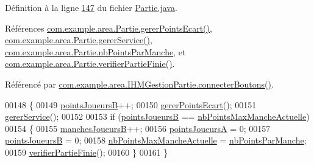 Définition à la ligne \hyperlink{_partie_8java_source_l00147}{147} du fichier \hyperlink{_partie_8java_source}{Partie.\+java}.



Références \hyperlink{_partie_8java_source_l00204}{com.\+example.\+area.\+Partie.\+gerer\+Points\+Ecart()}, \hyperlink{_partie_8java_source_l00220}{com.\+example.\+area.\+Partie.\+gerer\+Service()}, \hyperlink{_partie_8java_source_l00035}{com.\+example.\+area.\+Partie.\+nb\+Points\+Par\+Manche}, et \hyperlink{_partie_8java_source_l00192}{com.\+example.\+area.\+Partie.\+verifier\+Partie\+Finie()}.



Référencé par \hyperlink{_i_h_m_gestion_partie_8java_source_l00346}{com.\+example.\+area.\+I\+H\+M\+Gestion\+Partie.\+connecter\+Boutons()}.


\begin{DoxyCode}
00148     \{
00149         \hyperlink{classcom_1_1example_1_1area_1_1_partie_ae1ceb321b45437487124b1d886c7297c}{pointsJoueursB}++;
00150         \hyperlink{classcom_1_1example_1_1area_1_1_partie_a2838da99f206d736a22f8a3f271365b2}{gererPointsEcart}();
00151         \hyperlink{classcom_1_1example_1_1area_1_1_partie_a52c8e133b23468d4b2c4338a80c3763c}{gererService}();
00152 
00153         \textcolor{keywordflow}{if} (\hyperlink{classcom_1_1example_1_1area_1_1_partie_ae1ceb321b45437487124b1d886c7297c}{pointsJoueursB} == \hyperlink{classcom_1_1example_1_1area_1_1_partie_a4b5e5464eb3b37f7c78d4134bf29a7f8}{nbPointsMaxMancheActuelle})
00154         \{
00155             \hyperlink{classcom_1_1example_1_1area_1_1_partie_a9bb9a60be0b966b5a8bd5ac0934387bf}{manchesJoueursB}++;
00156             \hyperlink{classcom_1_1example_1_1area_1_1_partie_ad1075e561acb71ac3307570f79795b1c}{pointsJoueursA} = 0;
00157             \hyperlink{classcom_1_1example_1_1area_1_1_partie_ae1ceb321b45437487124b1d886c7297c}{pointsJoueursB} = 0;
00158             \hyperlink{classcom_1_1example_1_1area_1_1_partie_a4b5e5464eb3b37f7c78d4134bf29a7f8}{nbPointsMaxMancheActuelle} = 
      \hyperlink{classcom_1_1example_1_1area_1_1_partie_a23cd7e19042eece7057f810bba2f4f2c}{nbPointsParManche};
00159             \hyperlink{classcom_1_1example_1_1area_1_1_partie_ad07c65c2ba36cd08798cee1ba6b99c81}{verifierPartieFinie}();
00160         \}
00161     \}
\end{DoxyCode}
\mbox{\label{classcom_1_1example_1_1area_1_1_partie_a14ae07774755900e3ae4e7e6808126c6}} 
